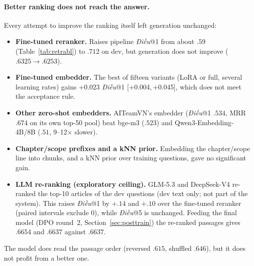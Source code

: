 \documentclass[11pt,a4paper]{article}
\newcommand{\dieu}{\textit{Điều}}
\newcommand{\ci}[2]{{\scriptsize[#1,\,#2]}}
\begin{document}
\paragraph{Better ranking does not reach the answer.}
Every attempt to improve the ranking itself left generation unchanged:
\begin{itemize}[leftmargin=*]
\item \textbf{Fine-tuned reranker.} Raises pipeline \dieu{}@1 from about $.59$ (Table~\ref{tab:retrabl}) to $.712$ on dev, but generation does not improve ($.6325\to.6253$).
\item \textbf{Fine-tuned embedder.} The best of fifteen variants (LoRA or full, several learning rates) gains $+0.023$ \dieu{}@1 \ci{+0.004}{+0.045}, which does not meet the acceptance rule.
\item \textbf{Other zero-shot embedders.} AITeamVN's embedder (\dieu{}@1 $.534$, MRR $.674$ on its own top-50 pool) beat bge-m3 ($.523$) and Qwen3-Embedding-4B/8B ($.51$, 9--12$\times$ slower).
\item \textbf{Chapter/scope prefixes and a kNN prior.} Embedding the chapter/scope line into chunks, and a kNN prior over training questions, gave no significant gain.
\item \textbf{LLM re-ranking (exploratory ceiling).} GLM-5.3 and DeepSeek-V4 re-ranked the top-10 articles of the dev questions (dev text only; not part of the system). This raises \dieu{}@1 by $+.14$ and $+.10$ over the fine-tuned reranker (paired intervals exclude 0), while \dieu{}@5 is unchanged. Feeding the final model (DPO round~2, Section~\ref{sec:posttrain}) the re-ranked passages gives $.6654$ and $.6637$ against $.6637$.
\end{itemize}
The model does read the passage order (reversed $.615$, shuffled $.646$), but it does not profit from a better one.
\end{document}
